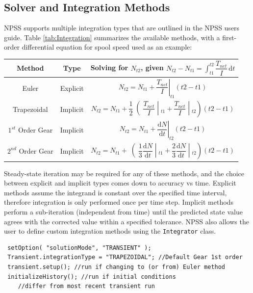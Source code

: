\documentclass[heading.tex]{subfiles}
\begin{document}
\subsection{Solver and Integration Methods}
NPSS supports multiple integration types that are outlined in the NPSS users guide.
\cite[chap.~7.1]{NPSS} Table \ref{tab:Integration} summarizes the available methods, with a 
first-order differential equation for spool speed used as an example: 

\begin{minipage}{\linewidth}
\centering
\bigskip
{} \label{tab:Integration}
\begin{tabular}{|c|c|c|}
\hline 
Method & Type & Solving for  $N_{t2}$, given  $N_{t2}- N_{t1}= \int_{t1}^{t2} \! \dfrac{T_{net}}{I} \, \mathrm{d}t $\\ 
\hline 
Euler & Explicit & $ \left.N_{t2}= N_{t1} + \dfrac{T_{net}}{I} \right|_{t1}^{}(t2-t1)$ \\ 
\hline 
Trapezoidal & Implicit & $ \left.N_{t2}= N_{t1} + \dfrac{1}{2}\middle(\dfrac{T_{net}}{I} \middle|_{t1}^{}+\dfrac{T_{net}}{I} \middle|_{t2}^{}\right)(t2-t1)$ \\ 
\hline 
$1^{st}$ Order Gear & Implicit & $ \left.N_{t2}= N_{t1} + \dfrac{ \mathrm{d}N }{ \mathrm{d}t } \right|_{t2}^{}(t2-t1)$ \\ 
\hline 
$2^{nd}$ Order Gear & Implicit & $ \left.N_{t2}= N_{t1} + \middle(\dfrac{1}{3}\dfrac{ \mathrm{d}N }{ \mathrm{d}t }\middle|_{t1}^{}+\dfrac{2}{3}\dfrac{ \mathrm{d}N }{ \mathrm{d}t }\middle|_{t2}^{}\right)(t2-t1)$ \\ 
\hline 
\end{tabular} 
\end{minipage}

Steady-state iteration may be required for any of these methods, and the choice between explicit
and implicit types comes down to accuracy vs time. Explicit methods assume the integrand is
constant over the specified time interval, therefore integration is only performed once per time
step. Implicit methods perform a sub-iteration (independent from time) until the predicted state
value agrees with the corrected value within a specified tolerance. NPSS also allows the user to
define custom integration methods using the \texttt{Integrator} class. \cite[chap.~15.2]{NPSS}  

\begin{adjustwidth}{-0.5cm}{-0.5cm}
 \begin{verbatim}
 setOption( "solutionMode", "TRANSIENT" );
 Transient.integrationType = "TRAPEZOIDAL"; //Default Gear 1st order
 transient.setup(); //run if changing to (or from) Euler method
 initializeHistory(); //run if initial conditions 
 	//differ from most recent transient run
 \end{verbatim}
 \end{adjustwidth} 
       
\end{document}
